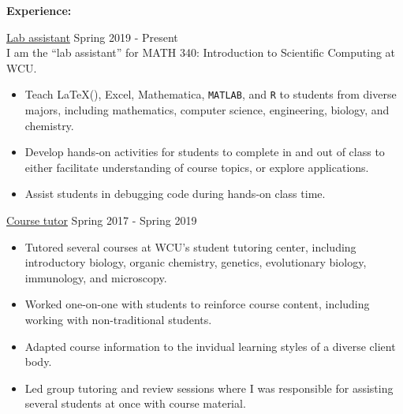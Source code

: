 \textbf{Experience:}

\ul{Lab assistant} \hfill Spring 2019 - Present \\
\indent I am the ``lab assistant'' for MATH 340: Introduction to Scientific Computing at WCU.
\begin{itemize}
\item Teach \LaTeX(), Excel, Mathematica, \texttt{MATLAB}, and \texttt{R} to students from diverse majors, including mathematics, computer science, engineering, biology, and chemistry.
\item Develop hands-on activities for students to complete in and out of class to either facilitate understanding of course topics, or explore applications.
\item Assist students in debugging code during hands-on class time.
\end{itemize}

\ul{Course tutor} \hfill Spring 2017 - Spring 2019
\begin{itemize}
\item Tutored several courses at WCU's student tutoring center, including introductory biology, organic chemistry, genetics, evolutionary biology, immunology, and microscopy.
\item Worked one-on-one with students to reinforce course content, including working with non-traditional students.
\item Adapted course information to the invidual learning styles of a diverse client body.
\item Led group tutoring and review sessions where I was responsible for assisting several students at once with course material.
\end{itemize}